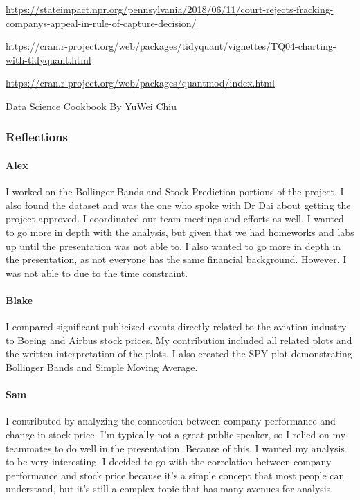 \documentclass[]{article}
\let\oldparagraph\paragraph
\renewcommand{\paragraph}[1]{\oldparagraph{#1}\mbox{}}
\begin{document}
\url{https://stateimpact.npr.org/pennsylvania/2018/06/11/court-rejects-fracking-companys-appeal-in-rule-of-capture-decision/}

\url{https://cran.r-project.org/web/packages/tidyquant/vignettes/TQ04-charting-with-tidyquant.html}

\url{https://cran.r-project.org/web/packages/quantmod/index.html}

Data Science Cookbook By YuWei Chiu

\hypertarget{reflections}{%
\subsubsection{\texorpdfstring{\textbf{Reflections}}{Reflections}}\label{reflections}}

\hypertarget{alex}{%
\paragraph{Alex}\label{alex}}

I worked on the Bollinger Bands and Stock Prediction portions of the
project. I also found the dataset and was the one who spoke with Dr Dai
about getting the project approved. I coordinated our team meetings and
efforts as well. I wanted to go more in depth with the analysis, but
given that we had homeworks and labs up until the presentation was not
able to. I also wanted to go more in depth in the presentation, as not
everyone has the same financial background. However, I was not able to
due to the time constraint.

\hypertarget{blake}{%
\paragraph{Blake}\label{blake}}

I compared significant publicized events directly related to the
aviation industry to Boeing and Airbus stock prices. My contribution
included all related plots and the written interpretation of the plots.
I also created the SPY plot demonstrating Bollinger Bands and Simple
Moving Average.

\hypertarget{sam}{%
\paragraph{Sam}\label{sam}}

I contributed by analyzing the connection between company performance
and change in stock price. I'm typically not a great public speaker, so
I relied on my teammates to do well in the presentation. Because of
this, I wanted my analysis to be very interesting. I decided to go with
the correlation between company performance and stock price because it's
a simple concept that most people can understand, but it's still a
complex topic that has many avenues for analysis.
\end{document}
